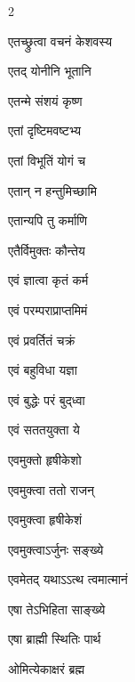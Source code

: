 \begin{multicols}{2}
\begin{indexlist}
\item एतच्छ्रुत्वा वचनं केशवस्य \dotfill {}
\item एतद् योनीनि भूतानि \dotfill {}
\item एतन्मे संशयं कृष्ण \dotfill {}
\item एतां दृष्टिमवष्टभ्य \dotfill {}
\item एतां विभूतिं योगं च \dotfill {}
\item एतान् न हन्तुमिच्छामि \dotfill {}
\item एतान्यपि तु कर्माणि \dotfill {}
\item एतैर्विमुक्तः कौन्तेय \dotfill {}
\item एवं ज्ञात्वा कृतं कर्म \dotfill {}
\item एवं परम्पराप्राप्तमिमं \dotfill {}
\item एवं प्रवर्तितं चक्रं \dotfill {}
\item एवं बहुविधा यज्ञा \dotfill {}
\item एवं बुद्धेः परं बुद्‍ध्वा \dotfill {}
\item एवं सततयुक्ता ये \dotfill {}
\item एवमुक्तो हृषीकेशो \dotfill {}
\item एवमुक्त्वा ततो राजन् \dotfill {}
\item एवमुक्त्वा हृषीकेशं \dotfill {}
\item एवमुक्त्वाऽर्जुनः सङ्ख्ये \dotfill {}
\item एवमेतद् यथाऽऽत्थ त्वमात्मानं \dotfill {}
\item एषा तेऽभिहिता साङ्ख्ये \dotfill {}
\item एषा ब्राह्मी स्थितिः पार्थ \dotfill {}
\end{indexlist}

\begin{indexlist}
\item ओमित्येकाक्षरं ब्रह्म \dotfill {}
\end{indexlist}


\end{multicols}
